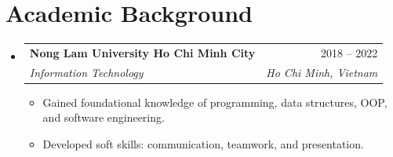 \documentclass[letterpaper,11pt]{article}
\makeatletter
\newcommand{\resumeItem}[1]{
  \item\small{
    {#1 \vspace{-2pt}}
  }
}
\newcommand{\resumeSubheading}[4]{
  \vspace{-2pt}\item
    \begin{tabular*}{0.97\textwidth}[t]{l@{\extracolsep{\fill}}r}
      \textbf{\small #1} & \small #2 \\
      \textit{\small #3} & \textit{\small #4} \\
    \end{tabular*}\vspace{-7pt}
}
\newcommand{\resumeSubHeadingListStart}{\begin{itemize}[leftmargin=0.15in, label={}]}
\newcommand{\resumeSubHeadingListEnd}{\end{itemize}}
\newcommand{\resumeItemListEnd}{\end{itemize}\vspace{-5pt}}
\newcommand{\resumeItemListStart}{\begin{itemize}[leftmargin=0.25in, topsep=0pt, parsep=0pt, partopsep=0pt, itemsep=2pt]}
\makeatother
\begin{document}
\section{Academic Background}
  \resumeSubHeadingListStart
    \resumeSubheading
      {Nong Lam University Ho Chi Minh City}{2018 -- 2022}
      {Information Technology}{Ho Chi Minh, Vietnam}
      \resumeItemListStart
        \resumeItem{Gained foundational knowledge of programming, data structures, OOP, and software engineering.}
        \resumeItem{Developed soft skills: communication, teamwork, and presentation.}
      \resumeItemListEnd
  \resumeSubHeadingListEnd
\end{document}
